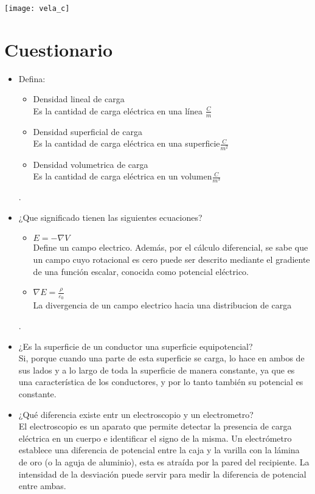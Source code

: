 \documentclass[11pt]{article}
\newenvironment{Figuras}
  {\par\medskip\noindent\minipage{\linewidth}}
  {\endminipage\par\medskip}
\begin{document}
\begin{multicols}{2}
\begin{itemize}
		\begin{Figuras}
			\centering
  			  \texttt{[image: vela\_c]}
			    \label{fig:mesh14}
		\end{Figuras}

		\end{itemize}
\section{Cuestionario}

\begin{itemize}

	\item Defina:
		\begin{itemize}
		\item Densidad lineal de carga\\
Es la cantidad de carga eléctrica en una línea $\frac{C}{m}$
		\item Densidad superficial de carga\\
Es la cantidad de carga eléctrica en una superficie$\frac{C}{m^2}$
		\item Densidad volumetrica de carga\\
Es la cantidad de carga eléctrica en un  volumen$\frac{C}{m^3}$
		\end{itemize}.
	\item¿Que significado tienen las siguientes ecuaciones?\\
		\begin{itemize}
		\item $E=-\nabla V$\\
Define un campo electrico. Además, por el cálculo diferencial, se sabe que un campo cuyo rotacional es cero puede ser descrito mediante el gradiente de una función escalar, conocida como potencial eléctrico.
		\item $\nabla E= \frac{\rho}{\varepsilon_0}$\\
La divergencia de un campo electrico hacia una distribucion de carga
		\end{itemize}.
	\item ¿Es la superficie de un conductor una superficie equipotencial?\\
Si, porque cuando una parte de esta superficie se carga, lo hace en ambos de sus lados y a lo largo de toda la superficie de manera constante, ya que es una característica de los conductores, y por lo tanto también su potencial es constante.
	\item ¿Qué diferencia existe entr un electroscopio y un electrometro?\\
 El electroscopio es un aparato que permite detectar la presencia de carga eléctrica en un cuerpo e identificar el signo de la misma. Un electrómetro establece una diferencia de potencial entre la caja y la varilla con la lámina de oro (o la aguja de aluminio), esta es atraída por la pared del recipiente. La intensidad de la desviación puede servir para medir la diferencia de potencial entre ambas. 
\end{itemize}


\end{multicols}
\end{document}
